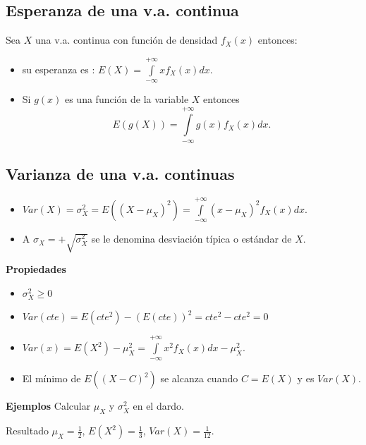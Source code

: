 \documentclass[12pt]{report}
\begin{document}
    \subsection{Esperanza de  una v.a. continua}
    Sea $X$ una v.a. continua con función de densidad $f_{X}(x)$
    entonces:

    \begin{itemize}
    \item su esperanza es :
    $E(X)=\int\limits_{-\infty}^{+\infty} xf_{X}(x)dx.$
    \item Si $g(x)$ es una función de la variable $X$ entonces
    $$E(g(X))=\int\limits_{-\infty}^{+\infty} g(x)f_{X}(x)dx.$$
    \end{itemize}

    \subsection{Varianza  de una  v.a. continuas}
        \begin{itemize}
            \item $Var(X)=\sigma_{X}^{2}=E((X-\mu_{X})^2)=
            \int\limits_{-\infty}^{+\infty} (x-\mu_{X})^2 f_{X}(x)dx.$
            \item A $\sigma_{X}=+\sqrt{\sigma_{X}^{2}}$ se le denomina desviación típica o
            estándar de $X$.
        \end{itemize}




\textbf{Propiedades}
\begin{itemize}
    \item $\sigma_{X}^{2}\geq 0$
    \item $Var(cte)=E(cte^2)-(E(cte))^2= cte^2 - cte^2=0$
    \item $Var(x)=E(X^{2})-\mu_{X}^2=\int\limits_{-\infty}^{+\infty}x^2
    f_{X}(x)dx - \mu_{X}^2.$
    \item El mínimo de $E((X-C)^2)$ se alcanza cuando $C=E(X)$ y es $Var(X)$.
    \end{itemize}

    \textbf{Ejemplos} Calcular $\mu_{X}$ y $\sigma_{X}^{2}$ en el dardo.

    Resultado $\mu_{X}=\frac{1}{2}$, $E(X^2)=\frac{1}{3}$,
    $Var(X)=\frac{1}{12}$.

\end{document}
